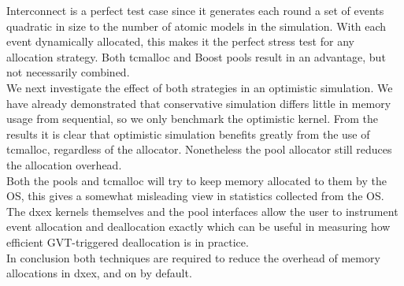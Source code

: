 Interconnect is a perfect test case since it generates each round a set of events quadratic in size to the number of atomic models in the simulation. With each event dynamically allocated, this makes it the perfect stress test for any allocation strategy. Both tcmalloc and Boost pools result in an advantage, but not necessarily combined. \\
We next investigate the effect of both strategies in an optimistic simulation. We have already demonstrated that conservative simulation differs little in memory usage from sequential, so we only benchmark the optimistic kernel. From the results it is clear that optimistic simulation benefits greatly from the use of tcmalloc, regardless of the allocator. Nonetheless the pool allocator still reduces the allocation overhead. \\
Both the pools and tcmalloc will try to keep memory allocated to them by the OS, this gives a somewhat misleading view in statistics collected from the OS. The dxex kernels themselves and the pool interfaces allow the user to instrument event allocation and deallocation exactly which can be useful in measuring how efficient GVT-triggered deallocation is in practice.\\
In conclusion both techniques are required to reduce the overhead of memory allocations in dxex, and on by default.
